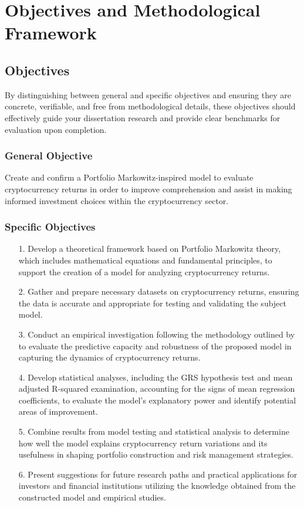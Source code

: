 \chapter{Objectives and Methodological Framework}
\label{c3}
\section{Objectives}
\label{c31}

By distinguishing between general and specific objectives and ensuring they are concrete, verifiable, and free from methodological details, these objectives should effectively guide your dissertation research and provide clear benchmarks for evaluation upon completion.
\subsection{General Objective}
Create and confirm a Portfolio Markowitz-inspired model to evaluate cryptocurrency returns in order to improve comprehension and assist in making informed investment choices within the cryptocurrency sector.
\subsection{Specific Objectives}
\begin{enumerate}
	\item[1.] Develop a theoretical framework based on Portfolio Markowitz theory, which includes mathematical equations and fundamental principles, to support the creation of a model for analyzing cryptocurrency returns.
	\item[2.] Gather and prepare necessary datasets on cryptocurrency returns, ensuring the data is accurate and appropriate for testing and validating the subject model.
	\item[3.] Conduct an empirical investigation following the methodology outlined by \cite{fama1993} to evaluate the predictive capacity and robustness of the proposed model in capturing the dynamics of cryptocurrency returns.
	\item[4.] Develop statistical analyses, including the GRS hypothesis test and mean adjusted R-squared examination, accounting for the signs of mean regression coefficients, to evaluate the model's explanatory power and identify potential areas of improvement.
	\item[5.] Combine results from model testing and statistical analysis to determine how well the model explains cryptocurrency return variations and its usefulness in shaping portfolio construction and risk management strategies.
	\item[6.] Present suggestions for future research paths and practical applications for investors and financial institutions utilizing the knowledge obtained from the constructed model and empirical studies.
\end{enumerate}
